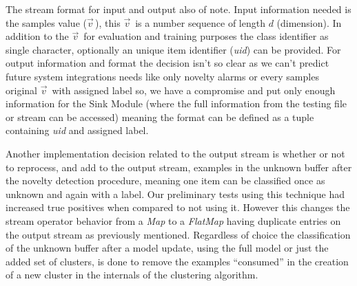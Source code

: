 \newcommand{\val}{$\vec{v}\,$\xspace}
The stream format for input and output also of note.
Input information needed is the samples value (\val), this \val is a number
sequence of length $d$ (dimension).
In addition to the \val for evaluation and training purposes the class
identifier as single character, optionally an unique item identifier
(\emph{uid}) can be provided.
For output information and format the decision isn't so clear as we can't
predict future system integrations needs like only novelty alarms or every
samples original \val with assigned label so, we have a compromise and put only
enough information for the Sink Module (where the full information
from the testing file or stream can be accessed) meaning the format can be
defined as a tuple containing \emph{uid} and assigned label.


Another implementation decision related to the output stream is whether or not
to reprocess, and add to the output stream, examples in the unknown buffer after
the novelty detection procedure, meaning one item can be classified once as
unknown and again with a label.
Our preliminary tests using this technique had increased true positives when compared to
not using it.
However this changes the stream operator behavior from a \textit{Map} to a
\textit{FlatMap} having duplicate entries on the output stream as previously
mentioned.
Regardless of choice the classification of the unknown buffer after a model
update, using the full model or just the added set of clusters, is done to
remove the examples ``consumed'' in the creation of a new cluster in the internals
of the clustering algorithm.


